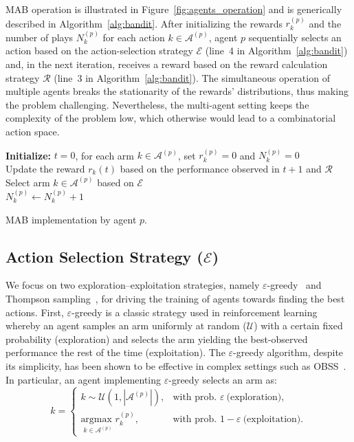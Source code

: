 MAB operation is illustrated in Figure~\ref{fig:agents_operation} and is generically described in Algorithm~\ref{alg:bandit}. After initializing the rewards $r_k^{(p)}$ and the number of plays $N_k^{(p)}$ for each action $k\in \mathcal{A}^{(p)}$, agent $p$ sequentially selects an action based on the action-selection strategy $\mathcal{E}$ (line~4 in Algorithm~\ref{alg:bandit}) and, in the next iteration, receives a reward based on the reward calculation strategy $\mathcal{R}$ (line~3 in Algorithm~\ref{alg:bandit}). The simultaneous operation of multiple agents breaks the stationarity of the rewards' distributions, thus making the problem challenging. Nevertheless, the multi-agent setting keeps the complexity of the problem low, which otherwise would lead to a combinatorial action space.

\begin{algorithm}[h!]
	\textbf{Initialize:} $t=0$, for each arm $k \in \mathcal{A}^{(p)}$, set $r^{(p)}_{k} = 0$ and $N^{(p)}_k = 0$ \\
	{
         Update the reward $r_{k}(t)$ based on the performance observed in $t+1$ and $\mathcal{R}$ \\
         Select arm $k\in \mathcal{A}^{(p)}$ based on $\mathcal{E}$\\
         $N^{(p)}_{k} \leftarrow N^{(p)}_{k} + 1$\\
	}
	\caption{MAB implementation by agent $p$.}
	\label{alg:bandit}
\end{algorithm}	

\subsection{Action Selection Strategy ($\mathcal{E}$)}
\label{sec:action_selection}

We focus on two exploration--exploitation strategies, namely $\varepsilon$-greedy~\cite{auer2002finite} and Thompson sampling~\cite{thompson1933likelihood}, for driving the training of agents towards finding the best actions. First, $\varepsilon$-greedy is a classic strategy used in reinforcement learning whereby an agent samples an arm uniformly at random ($\mathcal{U}$) with a certain fixed probability (exploration) and selects the arm yielding the best-observed performance the rest of the time (exploitation). The $\varepsilon$-greedy algorithm, despite its simplicity, has been shown to be effective in complex settings such as OBSS~\cite{barrachina2021multi}. In particular, an agent implementing $\varepsilon$-greedy selects an arm as:
\begin{equation}
    k=\begin{cases}      
    k \sim \mathcal{U}(1, |\mathcal{A}^{(p)}|), & \text{with prob. } \varepsilon~ \text{(exploration)}, \\ 
    \underset{k\in\mathcal{A}^{(p)}}{\text{argmax }} r^{(p)}_{k}, & \text{with prob. } 1 - \varepsilon~\text{(exploitation)}.
    \end{cases}
\end{equation}

